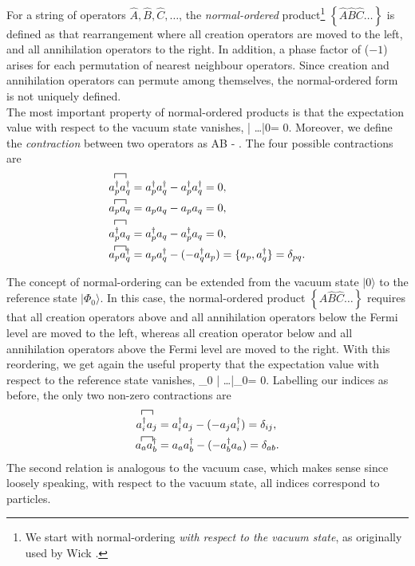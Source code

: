 For a string of operators $\hat{A},\hat{B},\hat{C},\dots$, the \textit{normal-ordered} product\footnote{We start with normal-ordering \textit{with respect to the vacuum state}, as originally used by Wick \cite{1950PhRv...80..268W}.} $\left\lbrace \hat{A}\hat{B}\hat{C}\dots\right\rbrace$  is defined as that rearrangement where all creation operators are moved to the left, and all annihilation operators to the right. In addition, a phase factor of ($-1$) arises for each permutation of nearest neighbour operators. Since creation and annihilation operators can permute among themselves, the normal-ordered form is not uniquely defined.\\
 The most important property of normal-ordered products is that the expectation value with respect to the vacuum state vanishes,
\be 
{} | \left\lbrace {}\dots \right\rbrace |0\rangle = 0.
\label{eq:normalordered1}
\ee
Moreover, we define the \textit{contraction} between two operators as
\be 
{}
AB \equiv {} - \left\lbrace {}\right\rbrace.
\ee
The four possible contractions are
\begin{align}
\begin{split}
\contraction{}{\ad_p}{}{\ad_q}\ad_p \ad_q &= \ad_p\ad_q - \ad_p \ad_q = 0,\\
\contraction{}{a_p}{}{a_q} a_p a_q &= a_p a_q - a_p a_q = 0,\\
\contraction{}{\ad_p}{}{a_q} \ad_p a_q&= \ad_p a_q - \ad_p a_q = 0,\\
\contraction{}{a_p}{}{\ad_q} a_p\ad_q &= a_p\ad_q - (-\ad_q a_p) = \lbrace a_p, \ad_q \rbrace = \delta_{pq}.
\end{split}
\end{align}

The concept of normal-ordering can be extended from the vacuum state $|0\rangle$ to the reference state $|\Phi_0\rangle$.  In this case, the normal-ordered product $\left\lbrace \hat{A}\hat{B}\hat{C}\dots\right\rbrace$   requires that all creation operators above and all annihilation operators below the Fermi level are moved to the left, whereas all creation operator below and all annihilation operators above the Fermi level are moved to the right. With this reordering, we get again the useful property that the expectation value with respect to the reference state vanishes,
\be 
\langle \Phi_0 | \left\lbrace {}\dots \right\rbrace |\Phi_0\rangle = 0.
\label{eq:normalordered2}
\ee
Labelling our indices as before, the only two non-zero contractions are
\begin{align}
\begin{split}
\contraction{}{\ad_i}{}{a_j} \ad_i a_j &= \ad_i a_j - (-a_j \ad_i) = \delta_{ij}, \\
\contraction{}{a_a}{}{\ad_b} a_a \ad_b &= a_a \ad_b - (-\ad_b a_a) = \delta_{ab}.
\end{split}
\end{align}
The second relation is analogous to the vacuum case, which makes sense since loosely speaking, with respect to the vacuum state, all indices correspond to particles.

